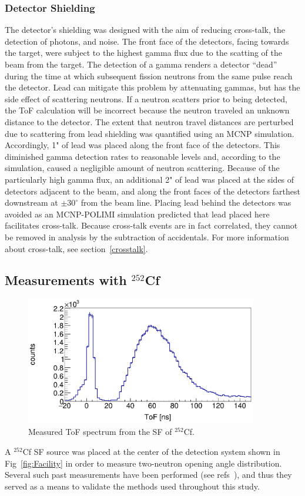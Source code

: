 \subsubsection{Detector Shielding}
The detector's shielding was designed with the aim of reducing cross-talk, the detection of photons, and noise.
The front face of the detectors, facing towards the target, were subject to the highest gamma flux due to the scatting of the beam from the target.
The detection of a gamma renders a detector ``dead'' during the time at which subsequent fission neutrons from the same pulse reach the detector.
Lead can mitigate this problem by attenuating gammas, but has the side effect of scattering neutrons.
If a neutron scatters prior to being detected, the ToF calculation will be incorrect because the neutron traveled an unknown distance to the detector.
The extent that neutron travel distances are perturbed due to scattering from lead shielding was quantified using an MCNP simulation.
Accordingly, 1" of lead was placed along the front face of the detectors.
This diminished gamma detection rates to reasonable levels and, according to the simulation, caused a negligible amount of neutron scattering.
Because of the particularly high gamma flux, an additional 2" of lead was placed at the sides of detectors adjacent to the beam, and along the front faces of the detectors farthest downstream at $\pm30^{\circ}$ from the beam line.
Placing lead behind the detectors was avoided as an MCNP-POLIMI simulation predicted that lead placed here facilitates cross-talk.
Because cross-talk events are in fact correlated, they cannot be removed in analysis by the subtraction of accidentals.
For more information about cross-talk, see section~\ref{crosstalk}.

\subsection{Measurements with $^{252}$Cf}
\begin{figure}[h]
\includegraphics[width=0.9\textwidth]{Content/Methods/Cf252ToF.png}
\caption{Measured ToF spectrum from the SF of $^{252}$Cf.}
\label{fig:Cf252ToF}
\end{figure}
A $^{252}$Cf SF source was placed at the center of the detection system shown in Fig~\ref{fig:Facility} in order to measure two-neutron opening angle distribution.
Several such past measurements have been performed (see refs~\cite{1975Cf252, Pozzi2014, 2008CF252, Verbeke2018}), and thus they served as a means to validate the methods used throughout this study.

